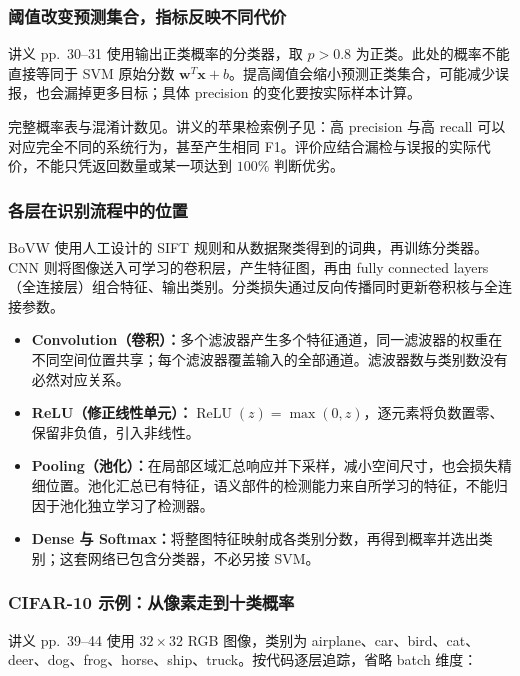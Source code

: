 \subsubsection*{阈值改变预测集合，指标反映不同代价}

讲义 pp.~30--31 使用输出正类概率的分类器，取 $p>0.8$ 为正类。此处的概率不能直接等同于 SVM 原始分数 $\bm w^T\bm x+b$。提高阈值会缩小预测正类集合，可能减少误报，也会漏掉更多目标；具体 precision 的变化要按实际样本计算。

完整概率表与混淆计数见。讲义的苹果检索例子见：高 precision 与高 recall 可以对应完全不同的系统行为，甚至产生相同 F1。评价应结合漏检与误报的实际代价，不能只凭返回数量或某一项达到 $100\%$ 判断优劣。


\subsubsection*{各层在识别流程中的位置}

BoVW 使用人工设计的 SIFT 规则和从数据聚类得到的词典，再训练分类器。CNN 则将图像送入可学习的卷积层，产生特征图，再由 fully connected layers（全连接层）组合特征、输出类别。分类损失通过反向传播同时更新卷积核与全连接参数。

\begin{itemize}
  \item \textbf{Convolution（卷积）：}多个滤波器产生多个特征通道，同一滤波器的权重在不同空间位置共享；每个滤波器覆盖输入的全部通道。滤波器数与类别数没有必然对应关系。
  \item \textbf{ReLU（修正线性单元）：}$\operatorname{ReLU}(z)=\max(0,z)$，逐元素将负数置零、保留非负值，引入非线性。
  \item \textbf{Pooling（池化）：}在局部区域汇总响应并下采样，减小空间尺寸，也会损失精细位置。池化汇总已有特征，语义部件的检测能力来自所学习的特征，不能归因于池化独立学习了检测器。
  \item \textbf{Dense 与 Softmax：}将整图特征映射成各类别分数，再得到概率并选出类别；这套网络已包含分类器，不必另接 SVM。
\end{itemize}

\subsubsection*{CIFAR-10 示例：从像素走到十类概率}

讲义 pp.~39--44 使用 $32\times32$ RGB 图像，类别为 airplane、car、bird、cat、deer、dog、frog、horse、ship、truck。按代码逐层追踪，省略 batch 维度：

